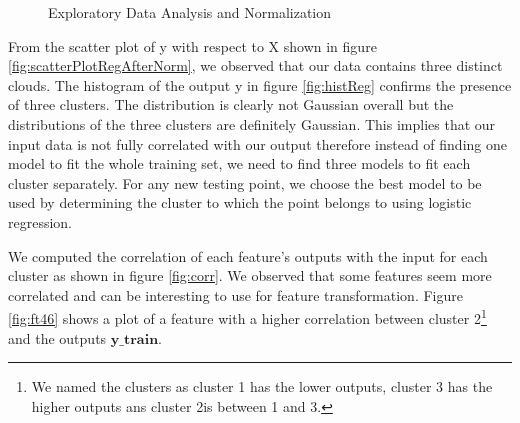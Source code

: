\documentclass{article} %
\begin{document}
\begin{figure}[!h]
\hfill
\caption{Exploratory Data Analysis and Normalization}
\end{figure}


From the scatter plot of y with respect to X shown in figure \ref{fig:scatterPlotRegAfterNorm}, we observed that our data contains three distinct clouds. The histogram of the output y in figure \ref{fig:histReg} confirms the presence of three clusters. The distribution is clearly not Gaussian overall but the distributions of the three clusters are definitely Gaussian. This implies that our input data is not fully correlated with our output therefore instead of finding one model to fit the whole training set, we need to find three models to fit each cluster separately. For any new testing point, we choose the best model to be used by determining the cluster to which the point belongs to using logistic regression.  

We computed the correlation of each feature's outputs with the input for each cluster as shown in figure \ref{fig:corr}.  We observed that some features seem more correlated and can be interesting to use for feature transformation. Figure \ref{fig:ft46} shows a plot of a feature with a higher correlation between cluster 2\footnote{\samepage We named the clusters as cluster 1 has the lower outputs, cluster 3 has the higher outputs ans cluster 2is between 1 and 3.} and the outputs $\mathbf{y\_train}$.
\end{document}

